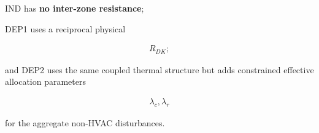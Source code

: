 \documentclass[11pt]{article}
\begin{document}
IND has \textbf{no inter-zone resistance};

DEP1 uses a reciprocal physical

\begin{align}
R_{DK};
\end{align}

and DEP2 uses the same coupled thermal structure but adds constrained effective allocation parameters

\begin{align}
\boxed{\lambda_c,\lambda_r}
\end{align}

for the aggregate non-HVAC disturbances.
\end{document}
